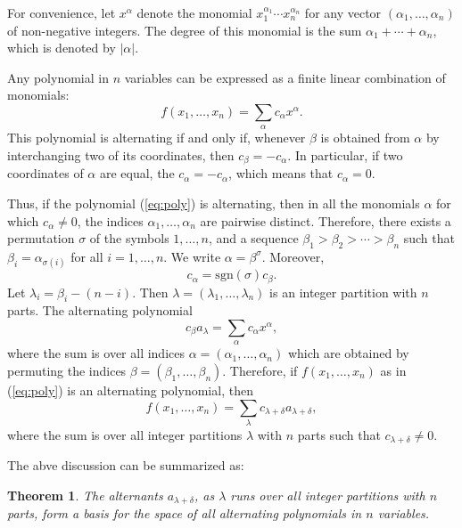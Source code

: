 \documentclass{amsart}
\theoremstyle{plain}
\newtheorem{theorem}{Theorem}[section]
\newcommand{\sgn}{\mathrm{sgn}}
\begin{document}
For convenience, let $x^\alpha$ denote the monomial $x_1^{\alpha_1}\dotsb x_n^{\alpha_n}$ for any vector $(\alpha_1,\dotsc,\alpha_n)$ of non-negative integers.
The degree of this monomial is the sum $\alpha_1+\dotsb+\alpha_n$, which is denoted by $|\alpha|$.

Any polynomial in $n$ variables can be expressed as a finite linear combination of monomials:
\begin{equation}
\label{eq:poly}
  f(x_1,\dotsc,x_n)=\sum_\alpha c_\alpha x^\alpha.
\end{equation}
This polynomial is alternating if and only if, whenever $\beta$ is obtained from $\alpha$ by interchanging two of its coordinates, then $c_\beta = -c_\alpha$.
In particular, if two coordinates of $\alpha$ are equal, the $c_\alpha = -c_\alpha$, which means that $c_\alpha=0$.

Thus, if the polynomial (\ref{eq:poly}) is alternating, then in all the monomials $\alpha$ for which $c_\alpha\neq 0$, the indices $\alpha_1,\dotsc,\alpha_n$ are pairwise distinct.
Therefore, there exists a permutation $\sigma$ of the symbols $1,\dotsc,n$, and a sequence $\beta_1>\beta_2>\dotsb >\beta_n$ such that $\beta_i = \alpha_{\sigma(i)}$ for all $i=1,\dotsc,n$.
We write $\alpha = \beta^\sigma$.
Moreover,
\begin{displaymath}
  c_\alpha = \sgn(\sigma) c_\beta.
\end{displaymath}
Let $\lambda_i=\beta_i-(n-i)$.
Then $\lambda=(\lambda_1,\dotsc,\lambda_n)$ is an integer partition with $n$ parts.
The alternating polynomial
\begin{displaymath}
  c_\beta a_\lambda = \sum_\alpha c_\alpha x^\alpha,
\end{displaymath}
where the sum is over all indices $\alpha=(\alpha_1,\dotsc,\alpha_n)$ which are obtained by permuting the indices $\beta=(\beta_1,\dotsc,\beta_n)$.
Therefore, if $f(x_1,\dotsc,x_n)$ as in (\ref{eq:poly}) is an alternating polynomial, then
\begin{displaymath}
  f(x_1,\dotsc,x_n) = \sum_\lambda c_{\lambda+\delta} a_{\lambda+\delta},
\end{displaymath}
where the sum is over all integer partitions $\lambda$ with $n$ parts such that $c_{\lambda+\delta}\neq 0$.

The abve discussion can be summarized as:
\begin{theorem}
  The alternants $a_{\lambda+\delta}$, as $\lambda$ runs over all integer partitions with $n$ parts, form a basis for the space of all alternating polynomials in $n$ variables.
\end{theorem}


\end{document}

